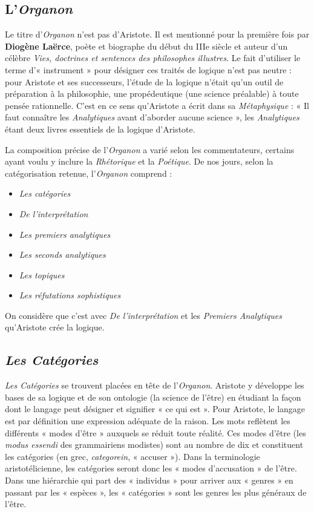 \subsection{L’\textit{Organon}}
Le titre d’\textit{Organon} n’est pas d’Aristote. Il est mentionné pour la première fois par \textbf{Diogène Laërce}, poète et biographe du début du IIIe siècle et auteur d’un célèbre \textit{Vies, doctrines et sentences des philosophes illustres}. Le fait d’utiliser le terme d’« instrument » pour désigner ces traités de logique n’est pas neutre : pour Aristote et ses successeurs, l’étude de la logique n’était qu’un outil de préparation à la philosophie, une propédeutique (une science préalable) à toute pensée rationnelle. C’est en ce sens qu’Aristote a écrit dans sa \textit{Métaphysique} : « Il faut connaître les \textit{Analytiques} avant d’aborder aucune science », les \textit{Analytiques} étant deux livres essentiels de la logique d’Aristote.

La composition précise de l’\textit{Organon} a varié selon les commentateurs, certains ayant voulu y inclure la \textit{Rhétorique} et la \textit{Poétique}. De nos jours, selon la catégorisation retenue, l’\textit{Organon} comprend :
\begin{itemize}
\item \textit{Les catégories}
\item \textit{De l’interprétation}
\item \textit{Les premiers analytiques}
\item \textit{Les seconds analytiques}
\item \textit{Les topiques}
\item \textit{Les réfutations sophistiques}
\end{itemize}
On considère que c’est avec \textit{De l’interprétation} et les \textit{Premiers Analytiques} qu’Aristote crée la logique.

\subsection{\textit{Les Catégories}}
\textit{Les Catégories} se trouvent placées en tête de l’\textit{Organon}. Aristote y développe les bases de sa logique et de son ontologie (la science de l’être) en étudiant la façon dont le langage peut désigner et signifier « ce qui est ». Pour Aristote, le langage est par définition une expression adéquate de la raison. Les mots reflètent les différents « modes d’être » auxquels se réduit toute réalité. Ces modes d’être (les \textit{modus essendi} des grammairiens modistes) sont au nombre de dix et constituent les catégories (en grec, \textit{categorein}, « accuser »). Dans la terminologie aristotélicienne, les catégories seront donc les « modes d’accusation » de l’être. Dans une hiérarchie qui part des « individus » pour arriver aux « genres » en passant par les « espèces », les « catégories » sont les genres les plus généraux de l’être.

